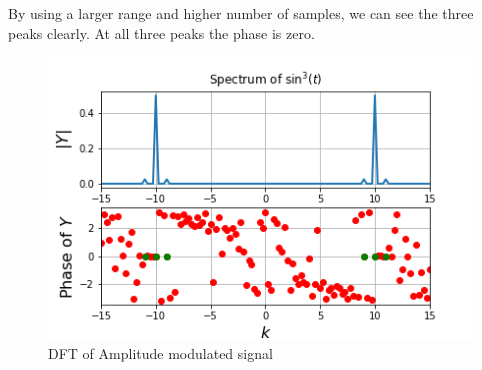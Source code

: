 \documentclass[11pt, a4paper]{article}
\begin{document}
By using a larger range and higher number of samples, we can see the three peaks clearly. At all three peaks the phase is zero.
\begin{figure}[!tbh]
   	\centering
   	\includegraphics[scale=0.8]{fig2.png}  %
   	\caption{DFT of Amplitude modulated signal}
   	\label{fig:sample}
   \end{figure} 
   
   \newpage
\end{document}
